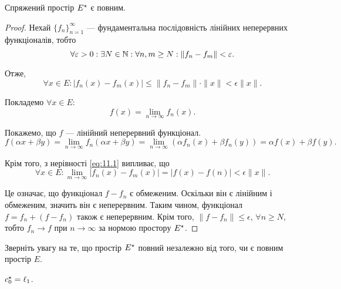 \begin{theorem}
Спряжений простір $E^\star$ є повним.
\end{theorem}

\begin{proof}
Нехай $\{f_n\}_{n = 1}^\infty$ --- фундаментальна
послідовність лінійних неперервних функціоналів, тобто
\begin{equation*}
    \forall \varepsilon > 0:
    \exists N \in \mathbb{N}:
    \forall n, m \ge N:
    \|f_n - f_m\| < \varepsilon.
\end{equation*}

Отже,
\begin{equation}
    \label{eq:11.1}
    \forall x \in E:
    |f_n(x) - f_m(x)| \le
    \|f_n - f_m\| \cdot \|x\| <
    \epsilon \|x\|.
\end{equation}

Покладемо $\forall x \in E$:
\begin{equation*}
    f(x) = \lim_{n \to \infty} f_n(x).
\end{equation*}

Покажемо, що $f$ --- лінійний неперервний функціонал.
\begin{equation*}
    f(\alpha x + \beta y) =
    \lim_{n \to \infty} f_n(\alpha x + \beta y) =
    \lim_{n \to \infty} ( \alpha f_n(x) + \beta f_n(y)) =
    \alpha f(x) + \beta f(y).
\end{equation*}

Крім того, з нерівності \eqref{eq:11.1} випливає, що
\begin{equation*}
    \forall x \in E:
    \lim_{m \to \infty} |f_n(x) - f_m(x)| =
    |f(x) - f(n)| < \epsilon \|x\|.
\end{equation*}

Це означає, що функціонал $f - f_n$ є обмеженим. Оскільки
він є лінійним і обмеженим, значить він є неперервним.
Таким чином, функціонал $f = f_n + (f - f_n)$ також є
неперервним. Крім того, $\|f - f_n\| \le \epsilon$,
$\forall n \ge N$, тобто $f_n \to f$
при $n \to \infty$ за нормою простору $E^\star$. 
\end{proof}

\begin{remark}
Зверніть увагу на те, що простір $E^\star$
повний незалежно від того, чи є повним простір $E$.
\end{remark}

\begin{example}
$c^\star_0 = \ell_1$.
\end{example}

